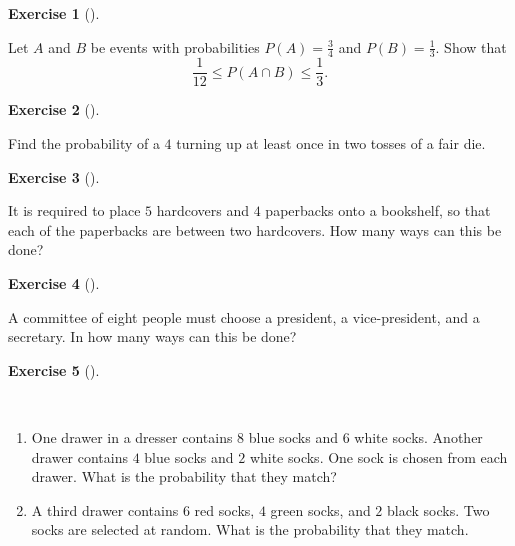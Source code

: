 \documentclass[
  letterpaper,
  DIV=11,
  numbers=noendperiod]{scrreprt}
\providecommand{\tightlist}{%
  \setlength{\itemsep}{0pt}\setlength{\parskip}{0pt}}\usepackage{longtable,booktabs,array}
\theoremstyle{definition}
\theoremstyle{definition}
\newtheorem{exercise}{Exercise}[chapter]
\theoremstyle{definition}
\theoremstyle{remark}
\begin{document}
\begin{exercise}[]\protect\hypertarget{exr-3.10}{}\label{exr-3.10}

Let \(A\) and \(B\) be events with probabilities \(P(A) = \frac{3}{4}\)
and \(P(B) = \frac{1}{3}\). Show that
\[\frac{1}{12}\leq P(A\cap B)\leq\frac{1}{3}.\]

\end{exercise}

\begin{exercise}[]\protect\hypertarget{exr-3.11}{}\label{exr-3.11}

Find the probability of a \(4\) turning up at least once in two tosses
of a fair die.

\end{exercise}

\begin{exercise}[]\protect\hypertarget{exr-3.12}{}\label{exr-3.12}

It is required to place \(5\) hardcovers and \(4\) paperbacks onto a
bookshelf, so that each of the paperbacks are between two hardcovers.
How many ways can this be done?

\end{exercise}

\begin{exercise}[]\protect\hypertarget{exr-3.13}{}\label{exr-3.13}

A committee of eight people must choose a president, a vice-president,
and a secretary. In how many ways can this be done?

\end{exercise}

\begin{exercise}[]\protect\hypertarget{exr-3.14}{}\label{exr-3.14}

~

\begin{enumerate}
\def\labelenumi{\alph{enumi}.}
\tightlist
\item
  One drawer in a dresser contains \(8\) blue socks and \(6\) white
  socks. Another drawer contains \(4\) blue socks and \(2\) white socks.
  One sock is chosen from each drawer. What is the probability that they
  match?
\item
  A third drawer contains \(6\) red socks, \(4\) green socks, and \(2\)
  black socks. Two socks are selected at random. What is the probability
  that they match.
\end{enumerate}

\end{exercise}
\end{document}
